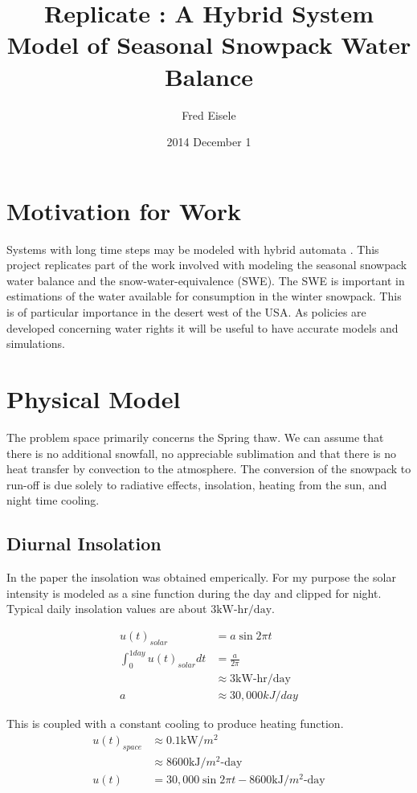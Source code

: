 \documentclass{article}
\title{Replicate : A Hybrid System Model of Seasonal Snowpack Water Balance}
\author{Fred Eisele }
\date{2014 December 1}
\begin{document}
\maketitle

\section{Motivation for Work}

Systems with long time steps may be modeled with hybrid automata
\citep{kerkez2010swb}.
This project replicates part of the work involved with modeling
the seasonal snowpack water balance and the snow-water-equivalence (SWE).
The SWE is important in estimations of the water available
for consumption in the winter snowpack.
This is of particular importance in the desert west of the USA.
As policies are developed concerning water rights it
will be useful to have accurate models and simulations.

\section{Physical Model}

The problem space primarily concerns the Spring thaw.
We can assume that there is no additional snowfall,
no appreciable sublimation and that there is no
heat transfer by convection to the atmosphere.
The conversion of the snowpack to run-off is due solely
to radiative effects, insolation, heating from the sun,
and night time cooling.

\subsection{Diurnal Insolation}

In the paper the insolation was obtained emperically.
For my purpose the solar intensity is modeled as a sine
function during the day and clipped for night.
Typical daily insolation values are about $3 \text{kW-hr/day}$.

\begin{align}
u(t)_{solar} &= a \sin{2 \pi t} \\
\int_0^{1 day} u(t)_{solar} dt &= \frac{a}{2 \pi} \\
  &\approx 3 \text{kW-hr/day} \\
a &\approx 30,000 kJ/day
\end{align}

This is coupled with a constant cooling to produce heating function.
\begin{align}
u(t)_{space} &\approx 0.1 \text{kW/$m^2$} \\
   &\approx 8600 \text{kJ/$m^2$-day} \\
u(t) &= 30,000 \sin{2 \pi t} - 8600 \text{kJ/$m^2$-day}
\end{align}
\end{document}
